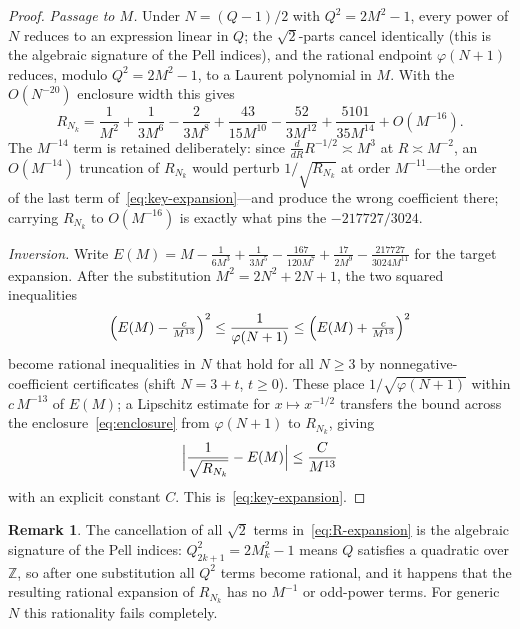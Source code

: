 \documentclass[12pt]{amsart}
\theoremstyle{definition}
\newtheorem{remark}[theorem]{Remark}
\newcommand{\Z}{\mathbb{Z}}
\begin{document}
\begin{proof}
  \emph{Passage to $M$.}  Under $N=(Q-1)/2$ with $Q^2=2M^2-1$, every power
  of $N$ reduces to an expression linear in $Q$; the $\sqrt2$-parts cancel
  identically (this is the algebraic signature of the Pell indices), and
  the rational endpoint $\varphi(N+1)$ reduces, modulo $Q^2=2M^2-1$, to a
  Laurent polynomial in $M$.  With the $O(N^{-20})$ enclosure width this
  gives
  \begin{equation}\label{eq:R-expansion}
    R_{N_k} = \frac{1}{M^2} + \frac{1}{3M^6} - \frac{2}{3M^8}
              + \frac{43}{15M^{10}} - \frac{52}{3M^{12}}
              + \frac{5101}{35M^{14}} + O(M^{-16}).
  \end{equation}
  The $M^{-14}$ term is retained deliberately: since
  $\tfrac{d}{dR}R^{-1/2}\asymp M^{3}$ at $R\asymp M^{-2}$, an $O(M^{-14})$
  truncation of $R_{N_k}$ would perturb $1/\sqrt{R_{N_k}}$ at order
  $M^{-11}$---the order of the last term of~\eqref{eq:key-expansion}---and
  produce the wrong coefficient there; carrying $R_{N_k}$ to $O(M^{-16})$
  is exactly what pins the $-217727/3024$.

  \emph{Inversion.}  Write
  $E(M)=M-\tfrac{1}{6M^3}+\tfrac{1}{3M^5}-\tfrac{167}{120M^7}
  +\tfrac{17}{2M^9}-\tfrac{217727}{3024M^{11}}$ for the target expansion.
  After the substitution $M^2=2N^2+2N+1$, the two squared inequalities
  \[
    \Bigl(E(M)-\tfrac{c}{M^{13}}\Bigr)^{2}\le \frac{1}{\varphi(N+1)}
    \le \Bigl(E(M)+\tfrac{c}{M^{13}}\Bigr)^{2}
  \]
  become rational inequalities in $N$ that hold for all $N\ge 3$ by
  nonnegative-coefficient certificates (shift $N=3+t$, $t\ge 0$).  These
  place $1/\sqrt{\varphi(N+1)}$ within $c\,M^{-13}$ of $E(M)$; a Lipschitz
  estimate for $x\mapsto x^{-1/2}$ transfers the bound across the
  enclosure~\eqref{eq:enclosure} from $\varphi(N+1)$ to $R_{N_k}$, giving
  \[
    \Bigl|\frac{1}{\sqrt{R_{N_k}}}-E(M)\Bigr|\le\frac{C}{M^{13}}
  \]
  with an explicit constant $C$.  This is~\eqref{eq:key-expansion}.
\end{proof}

\begin{remark}
  The cancellation of all $\sqrt{2}$ terms in~\eqref{eq:R-expansion}
  is the algebraic signature of the Pell indices: $Q_{2k+1}^2 = 2M_k^2-1$
  means $Q$ satisfies a quadratic over $\Z$, so after one substitution
  all $Q^2$ terms become rational, and it happens that the resulting
  rational expansion of $R_{N_k}$ has no $M^{-1}$ or odd-power terms.
  For generic $N$ this rationality fails completely.
\end{remark}
\end{document}
